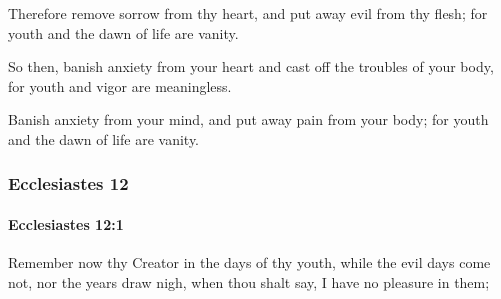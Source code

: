 			\begin{versebox}
					\item[BHS] 
					\item[LXX] 
					\item[ASV] Therefore remove sorrow from thy heart, and put away evil from thy flesh; for youth and the dawn of life are vanity.
					\item[NIV] So then, banish anxiety from your heart and cast off the troubles of your body, for youth and vigor are meaningless.
					\item[NRSV] Banish anxiety from your mind, and put away pain from your body; for youth and the dawn of life are vanity.
			\end{versebox}
	\subsubsection{Ecclesiastes 12} %
		\label{ECCLESIASTES-12}

		\paragraph{Ecclesiastes 12:1} %
			\label{ECCLESIASTES-12-1}

			Remember now thy Creator in the days of thy youth, while the evil days come not, nor the years draw nigh, when thou shalt say, I have no pleasure in them;

